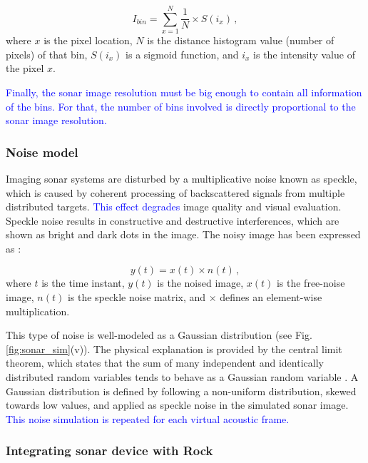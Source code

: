 \documentclass[final,5p,times]{elsarticle}
\begin{document}
\begin{equation}
    \label{eq:1}
    I_{bin} = \sum\limits_{x=1}^N \frac{1}{N} \times S(i_{x}) \, ,
\end{equation}
where $x$ is the pixel location, $N$ is the distance histogram
value (number of pixels) of that bin, $S(i_{x})$ is a sigmoid function,
and $i_{x}$ is the intensity value of the pixel $x$.

\textcolor{blue}{Finally, the sonar image resolution must be big enough to contain all information of the bins. For that, the number of bins involved is directly proportional to the sonar image resolution.}

\subsubsection{Noise model}
\label{dev:noise}

Imaging sonar systems are disturbed by a multiplicative noise known as speckle,
which is caused by coherent processing of backscattered signals from multiple
distributed targets. \textcolor{blue}{This effect degrades} image quality and visual evaluation. Speckle noise results in constructive and destructive interferences,
which are shown as bright and dark dots in the image. The noisy image has been
expressed as \cite{lee1980}:

\begin{equation}
\label{eq:2}
y(t) = x(t) \times n(t) \, ,
\end{equation}
where $t$ is the time instant, $y(t)$ is the noised image, $x(t)$ is the
free-noise image, $n(t)$ is the speckle noise matrix, and $\times$ defines an
element-wise multiplication.

This type of noise is well-modeled as a Gaussian distribution (see Fig. \ref{fig:sonar_sim}(v)). The physical explanation is provided by the central limit theorem, which states that the
sum of many independent and identically distributed random variables tends
to behave as a Gaussian random variable \textcolor{blue}{\cite{papoulis2002}}. A Gaussian distribution is defined by following a non-uniform distribution, skewed towards low values, and applied as speckle noise in the simulated sonar image. \textcolor{blue}{This noise simulation is repeated for each virtual acoustic frame.}

\subsubsection{Integrating sonar device with Rock}
\label{dev:rock}
\end{document}
